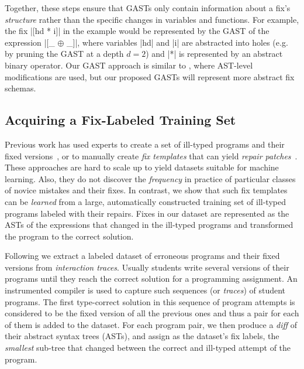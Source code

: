 Together, these steps ensure that GASTs only contain information about a fix's
\emph{structure} rather than the specific changes in variables and functions.
%
For example, the fix |[hd * i]| in the \mbd example would be represented by the
GAST of the expression |[_ $\oplus$ _]|, where variables |hd| and |i| are
abstracted into holes (e.g. by pruning the GAST at a depth $d=2$) and |*| is
represented by an abstract binary operator. Our GAST approach is similar to
\citep{Lerner2007-dt}, where AST-level modifications are used, but our proposed
GASTs will represent more abstract fix schemas.


\subsection{Acquiring a Fix-Labeled Training Set}
\label{sec:overview:data}

Previous work has used experts to create a set of ill-typed programs and their
fixed versions~\citep[][]{Lerner2007-dt, Loncaric2016-uk}, or to manually create
\emph{fix templates} that can yield \emph{repair
patches}~\citep[][]{martinez2013automatically,martinez2015mining}.
%
These approaches are hard to scale up to yield datasets suitable for machine
learning. Also, they do not discover the \emph{frequency} in practice of particular
classes of novice mistakes and their fixes.
%
In contrast, we show that such fix templates can be \emph{learned} from a large,
automatically constructed training set of ill-typed programs labeled with their
repairs.
%
Fixes in our dataset are represented as the ASTs of the expressions that changed
in the ill-typed programs and transformed the program to the correct solution.

Following \citep{Seidel:2017} we extract a labeled dataset of erroneous programs
and their fixed versions from \emph{interaction traces}. Usually students write
several versions of their programs until they reach the correct solution for a
programming assignment. An instrumented compiler is used to capture such
sequences (or \emph{traces}) of student programs. The first type-correct
solution in this sequence of program attempts is considered to be the fixed
version of all the previous ones and thus a pair for each of them is added to
the dataset. For each program pair, we then produce a \emph{diff} of their
abstract syntax trees (ASTs), and assign as the dataset's fix labels, the
\emph{smallest} sub-tree that changed between the correct and ill-typed attempt
of the program.


